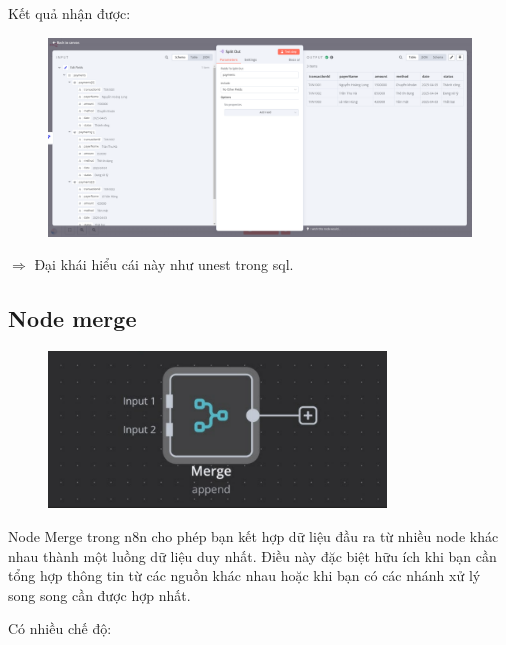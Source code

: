 \newpage

Kết quả nhận được:

\begin{figure}[htbp]
    \centering
    \includegraphics[width=1\linewidth]{Chap1-7/splitout.pdf}
\end{figure}

$\Rightarrow$ Đại khái hiểu cái này như unest trong sql.

\subsection{Node merge}
\begin{figure}[htbp]
    \centering
    \includegraphics[width=0.8\textwidth]{Chap1-7/merge-merge.pdf}
\end{figure}

Node Merge trong n8n cho phép bạn kết hợp dữ liệu đầu ra từ nhiều node khác nhau thành một luồng dữ liệu duy nhất. Điều này đặc biệt hữu ích khi bạn cần tổng hợp thông tin từ các nguồn khác nhau hoặc khi bạn có các nhánh xử lý song song cần được hợp nhất.

Có nhiều chế độ:

